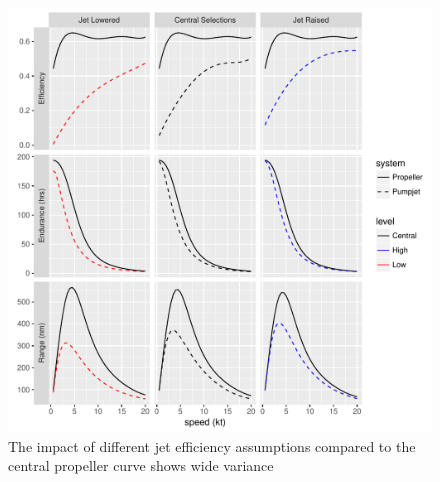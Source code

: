 \documentclass{article}\usepackage[]{graphicx}\usepackage[]{color}
\makeatletter
\def\maxwidth{ %
  \ifdim\Gin@nat@width>\linewidth
    \linewidth
  \else
    \Gin@nat@width
  \fi
}
\newenvironment{knitrout}{}{} %
\makeatother
\begin{document}
\begin{figure}
\begin{knitrout}
\color{fgcolor}

{\centering \includegraphics[width=\maxwidth]{figures/plots-plot_results2-1} 

}



\end{knitrout}
\caption{The impact of different jet efficiency assumptions compared to the central propeller curve shows wide variance}
\label{fig:central_jet}
\end{figure}
\end{document}
